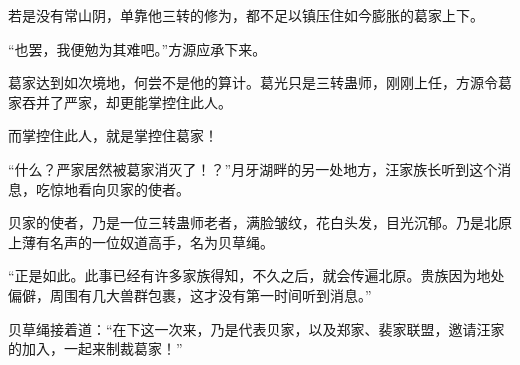 \begin{this_body}
若是没有常山阴，单靠他三转的修为，都不足以镇压住如今膨胀的葛家上下。

“也罢，我便勉为其难吧。”方源应承下来。

葛家达到如次境地，何尝不是他的算计。葛光只是三转蛊师，刚刚上任，方源令葛家吞并了严家，却更能掌控住此人。

而掌控住此人，就是掌控住葛家！

“什么？严家居然被葛家消灭了！？”月牙湖畔的另一处地方，汪家族长听到这个消息，吃惊地看向贝家的使者。

贝家的使者，乃是一位三转蛊师老者，满脸皱纹，花白头发，目光沉郁。乃是北原上薄有名声的一位奴道高手，名为贝草绳。

“正是如此。此事已经有许多家族得知，不久之后，就会传遍北原。贵族因为地处偏僻，周围有几大兽群包裹，这才没有第一时间听到消息。”

贝草绳接着道：“在下这一次来，乃是代表贝家，以及郑家、裴家联盟，邀请汪家的加入，一起来制裁葛家！”

\end{this_body}

